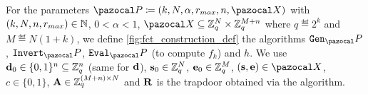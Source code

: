 \begin{definition}\label{def:ourConstruction}
  For the parameters $\cP \eqdef (k,N,\alpha,r_{max},n,\ccX)$ with $(k,N,n,r_{max}) \in \mathbb{N}$, $0<\alpha<1$, $\ccX \subseteq \Z_q^N \times \Z_q^{M+n}$ where $q \eqdef 2^k$ and $M \eqdef N(1+k)$, we define \cref{fig:fct_construction_def} the algorithms $\Gen_\cP$, $\Dec_\cP$, $\Eval_\cP$ (to compute $f_k$) and $h$. We use $\mathbf{d}_0 \in \{0,1\}^n \subseteq \mathbb{Z}_q^n$ (same for $\mathbf{d}$), $\mathbf{s}_0 \in \mathbb{Z}_q^{N}$, $\mathbf{e}_0 \in \mathbb{Z}_q^{M}$, $(\vect{s},\vect{e}) \in \ccX$, $c \in \{0,1\}$, $\mathbf{A} \in \mathbb{Z}_q^{(M+n) \times N}$ and $\mathbf{R}$ is the trapdoor obtained via the \cite{MP11} algorithm.

  \begin{figure}[htb]
    \centering
    \begin{pcvstack}[boxed, center,space=0.3cm]
      \begin{pchstack}[space=0.3cm]
        {\normalfont{}}
        {\normalfont{}}
\end{pchstack}
\end{pcvstack}
\end{figure}
\end{definition}
